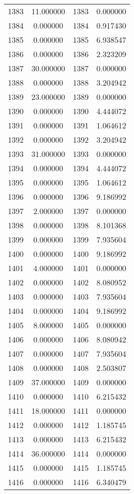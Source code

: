 \documentclass[12pt]{article}
\begin{document}
\begin{longtable}{@{}cccc@{}}
1383 & 11.000000 & 1383 & 0.000000 \\
1384 & 0.000000 & 1384 & 0.917430 \\
1385 & 0.000000 & 1385 & 6.938547 \\
1386 & 0.000000 & 1386 & 2.323209 \\
1387 & 30.000000 & 1387 & 0.000000 \\
1388 & 0.000000 & 1388 & 3.204942 \\
1389 & 23.000000 & 1389 & 0.000000 \\
1390 & 0.000000 & 1390 & 4.444072 \\
1391 & 0.000000 & 1391 & 1.064612 \\
1392 & 0.000000 & 1392 & 3.204942 \\
1393 & 31.000000 & 1393 & 0.000000 \\
1394 & 0.000000 & 1394 & 4.444072 \\
1395 & 0.000000 & 1395 & 1.064612 \\
1396 & 0.000000 & 1396 & 9.186992 \\
1397 & 2.000000 & 1397 & 0.000000 \\
1398 & 0.000000 & 1398 & 8.101368 \\
1399 & 0.000000 & 1399 & 7.935604 \\
1400 & 0.000000 & 1400 & 9.186992 \\
1401 & 4.000000 & 1401 & 0.000000 \\
1402 & 0.000000 & 1402 & 8.080952 \\
1403 & 0.000000 & 1403 & 7.935604 \\
1404 & 0.000000 & 1404 & 9.186992 \\
1405 & 8.000000 & 1405 & 0.000000 \\
1406 & 0.000000 & 1406 & 8.080942 \\
1407 & 0.000000 & 1407 & 7.935604 \\
1408 & 0.000000 & 1408 & 2.503807 \\
1409 & 37.000000 & 1409 & 0.000000 \\
1410 & 0.000000 & 1410 & 6.215432 \\
1411 & 18.000000 & 1411 & 0.000000 \\
1412 & 0.000000 & 1412 & 1.185745 \\
1413 & 0.000000 & 1413 & 6.215432 \\
1414 & 36.000000 & 1414 & 0.000000 \\
1415 & 0.000000 & 1415 & 1.185745 \\
1416 & 0.000000 & 1416 & 6.340479 \\

\end{longtable}
\end{document}
